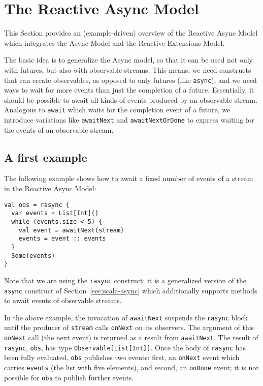 \documentclass{acm_proc_article-sp}
\begin{document}
\section{The Reactive Async Model}

This Section provides an (example-driven) overview of the Reactive Async Model
which integrates the Async Model and the Reactive Extensions Model.

The basic idea is to generalize the Async model, so that it can be used not
only with futures, but also with observable streams. This means, we need
constructs that can create observables, as opposed to only futures (like
\verb|async|), and we need ways to wait for more events than just the
completion of a future. Essentially, it should be possible to await all kinds
of events produced by an observable stream. Analogous to \verb|await| which
waits for the completion event of a future, we introduce variations like
\verb|awaitNext| and \verb|awaitNextOrDone| to express waiting for the events
of an observable stream.

\subsection{A first example}

The following example shows how to await a fixed number of events of a stream
in the Reactive Async Model:

\begin{lstlisting}
val obs = rasync {
  var events = List[Int]()
  while (events.size < 5) {
    val event = awaitNext(stream)
    events = event :: events
  }
  Some(events)
}
\end{lstlisting}

Note that we are using the \verb|rasync| construct; it is a generalized
version of the \verb|async| construct of Section~\ref{sec:scala-async} which
additionally supports methods to await events of observable streams.

In the above example, the invocation of \verb|awaitNext| suspends the
\verb|rasync| block until the producer of \verb|stream| calls \verb|onNext| on
its observers. The argument of this \verb|onNext| call (the next event) is
returned as a result from \verb|awaitNext|. The result of \verb|rasync|,
\verb|obs|, has type \verb|Observable[List[Int]]|. Once the body of
\verb|rasync| has been fully evaluated, \verb|obs| publishes two events:
first, an \verb|onNext| event which carries \verb|events| (the list with five
elements), and second, an \verb|onDone| event; it is not possible for
\verb|obs| to publish further events.
\end{document}
